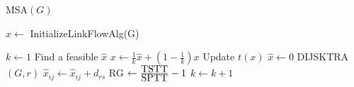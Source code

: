 \begin{algorithm}
\caption{MSA$(G)$}
\begin{algorithmic}
\STATE  $\hat{x}\leftarrow$ InitializeLinkFlowAlg(G)

\STATE $k\leftarrow 1$
\STATE Find a feasible $\hat{x}$
	\STATE $x\leftarrow \frac{1}{k}\hat{x} + (1-\frac{1}{k})x$
	\STATE Update $t(x)$
	\STATE $\hat{x}\leftarrow 0$
		\STATE DIJSKTRA$(G, r)$
			\STATE $\hat{x}_{ij} \leftarrow \hat{x}_{ij}+d_{rs}$
		\ENDFOR
	\ENDFOR
	\STATE RG $\leftarrow \frac{\hbox{TSTT}}{\hbox{SPTT}} - 1$
	\STATE $k\leftarrow k+1$
\ENDWHILE
\end{algorithmic}
\end{algorithm}
